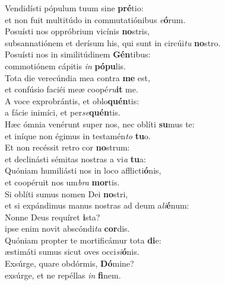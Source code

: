 \evenverse Vendidísti pópulum tuum sine \textbf{pré}tio:~\*\\
\evenverse et non fuit multitúdo in commutatiónibus \textit{e}\textbf{ó}rum.\\
\oddverse Posuísti nos oppróbrium vicínis \textbf{no}stris,~\*\\
\oddverse subsannatiónem et derísum his, qui sunt in circúi\textit{tu} \textbf{no}stro.\\
\evenverse Posuísti nos in similitúdinem \textbf{Gén}tibus:~\*\\
\evenverse commotiónem cápitis \textit{in} \textbf{pó}\textbf{pu}lis.\\
\oddverse Tota die verecúndia mea contra \textbf{me} est,~\*\\
\oddverse et confúsio faciéi meæ coopé\textit{ru}\textbf{it} me.\\
\evenverse A voce exprobrántis, et oblo\textbf{quén}tis:~\*\\
\evenverse a fácie inimíci, et per\textit{se}\textbf{quén}tis.\\
\oddverse Hæc ómnia venérunt super nos, nec oblíti \textbf{su}mus te:~\*\\
\oddverse et iníque non égimus in testamén\textit{to} \textbf{tu}o.\\
\evenverse Et non recéssit retro cor \textbf{no}strum:~\*\\
\evenverse et declinásti sémitas nostras a vi\textit{a} \textbf{tu}a:\\
\oddverse Quóniam humiliásti nos in loco afflicti\textbf{ó}nis,~\*\\
\oddverse et coopéruit nos um\textit{bra} \textbf{mor}tis.\\
\evenverse Si oblíti sumus nomen Dei \textbf{no}stri,~\*\\
\evenverse et si expándimus manus nostras ad deum a\textit{li}\textbf{é}num:\\
\oddverse Nonne Deus requíret \textbf{i}sta?~\*\\
\oddverse ipse enim novit abscóndi\textit{ta} \textbf{cor}dis.\\
\evenverse Quóniam propter te mortificámur tota \textbf{di}e:~\*\\
\evenverse æstimáti sumus sicut oves occi\textit{si}\textbf{ó}nis.\\
\oddverse Exsúrge, quare obdórmis, \textbf{Dó}mine?~\*\\
\oddverse exsúrge, et ne repéllas \textit{in} \textbf{fi}nem.\\
